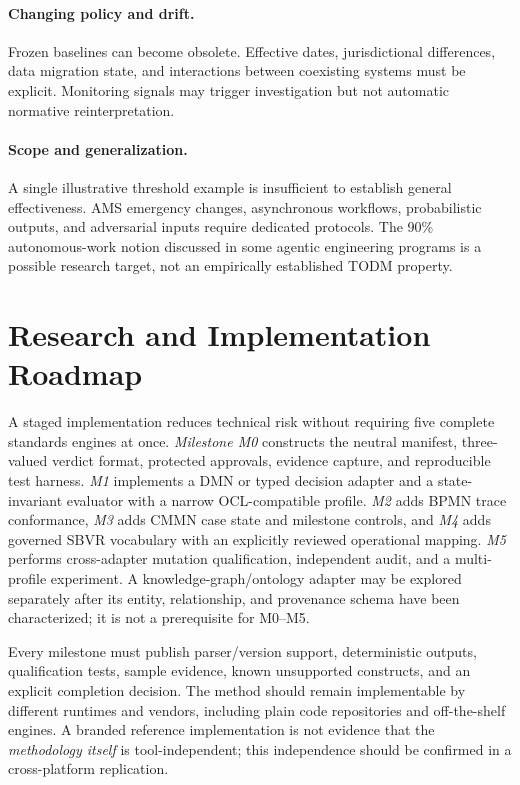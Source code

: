 \documentclass[11pt,a4paper]{article}
\begin{document}
\paragraph{Changing policy and drift.} Frozen baselines can become obsolete. Effective dates, jurisdictional differences, data migration state, and interactions between coexisting systems must be explicit. Monitoring signals may trigger investigation but not automatic normative reinterpretation.
\paragraph{Scope and generalization.} A single illustrative threshold example is insufficient to establish general effectiveness. AMS emergency changes, asynchronous workflows, probabilistic outputs, and adversarial inputs require dedicated protocols. The 90\% autonomous-work notion discussed in some agentic engineering programs is a possible research target, not an empirically established TODM property.

\section{Research and Implementation Roadmap}
A staged implementation reduces technical risk without requiring five complete standards engines at once. \emph{Milestone M0} constructs the neutral manifest, three-valued verdict format, protected approvals, evidence capture, and reproducible test harness. \emph{M1} implements a DMN or typed decision adapter and a state-invariant evaluator with a narrow OCL-compatible profile. \emph{M2} adds BPMN trace conformance, \emph{M3} adds CMMN case state and milestone controls, and \emph{M4} adds governed SBVR vocabulary with an explicitly reviewed operational mapping. \emph{M5} performs cross-adapter mutation qualification, independent audit, and a multi-profile experiment. A knowledge-graph/ontology adapter may be explored separately after its entity, relationship, and provenance schema have been characterized; it is not a prerequisite for M0--M5.

Every milestone must publish parser/version support, deterministic outputs, qualification tests, sample evidence, known unsupported constructs, and an explicit completion decision. The method should remain implementable by different runtimes and vendors, including plain code repositories and off-the-shelf engines. A branded reference implementation is not evidence that the \emph{methodology itself} is tool-independent; this independence should be confirmed in a cross-platform replication.
\end{document}
